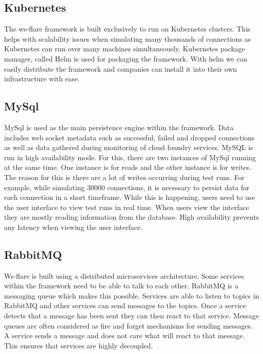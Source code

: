 \subsection{Kubernetes}

The ws-flare framework is built exclusively to run on Kubernetes clusters. This helps with scalability issues when simulating many thousands of connections as Kubernetes can run over many machines simultaneously. Kubernetes package manager, called Helm \cite{helm} is used for packaging the framework. With helm we can easily distribute the framework and companies can install it into their own infrastructure with ease.

\subsection{MySql}

MySql is used as the main persistence engine within the framework. Data includes web socket metadata such as successful, failed and dropped connections as well as data gathered during monitoring of cloud foundry services. MySQL is run in high availability mode. For this, there are two instances of MySql running at the same time. One instance is for reads and the other instance is for writes. The reason for this is there are a lot of writes occurring during test runs. For example, while simulating 30000 connections, it is necessary to persist data for each connection in a short timeframe. While this is happening, users need to use the user interface to view test runs in real time. When users view the interface they are mostly reading information from the database. High availability prevents any latency when viewing the user interface.

\subsection{RabbitMQ}

Ws-flare is built using a distributed microservices architecture. Some services within the framework need to be able to talk to each other. RabbitMQ is a messaging queue which makes this possible. Services are able to listen to topics in RabbitMQ and other services can send messages to the topics. Once a service detects that a message has been sent they can then react to that service. Message queues are often considered as fire and forget mechanisms for sending messages. A service sends a message and does not care what will react to that message. This ensures that services are highly decoupled.

